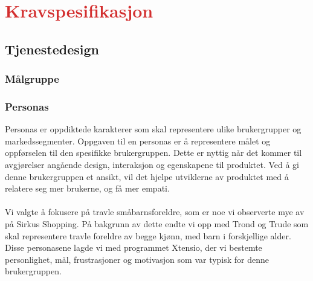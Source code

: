 \section{\textcolor[HTML]{D32F2F}{Kravspesifikasjon}}

\subsection{Tjenestedesign}

\subsubsection{Målgruppe}

\subsubsection{Personas}
Personas er oppdiktede karakterer som skal representere ulike brukergrupper og markedssegmenter. Oppgaven til en personas er å representere målet og oppførselen til den spesifikke brukergruppen. Dette er nyttig når det kommer til avgjørelser angående design, interaksjon og egenskapene til produktet. Ved å gi denne brukergruppen et ansikt, vil det hjelpe utviklerne av produktet med å relatere seg mer brukerne, og få mer empati.
\\\\
Vi valgte å fokusere på travle småbarnsforeldre, som er noe vi observerte mye av på Sirkus Shopping. På bakgrunn av dette endte vi opp med Trond og Trude som skal representere travle foreldre av begge kjønn, med barn i forskjellige alder. Disse personasene lagde vi med programmet Xtensio, der vi bestemte personlighet, mål, frustrasjoner og motivasjon som var typisk for denne brukergruppen.


